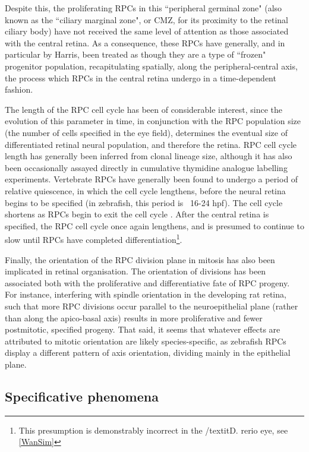Despite this, the proliferating RPCs in this ``peripheral germinal zone" (also known as the ``ciliary marginal zone", or CMZ, for its proximity to the retinal ciliary body) have not received the same level of attention as those associated with the central retina. As a consequence, these RPCs have generally, and in particular by Harris, been treated as though they are a type of ``frozen" progenitor population, recapitulating spatially, along the peripheral-central axis, the process which RPCs in the central retina undergo in a time-dependent fashion\cite{Harris1998}.

The length of the RPC cell cycle has been of considerable interest, since the evolution of this parameter in time, in conjunction with the RPC population size (the number of cells specified in the eye field), determines the eventual size of differentiated retinal neural population, and therefore the retina. RPC cell cycle length has generally been inferred from clonal lineage size, although it has also been occasionally assayed directly in cumulative thymidine analogue labelling experiments. Vertebrate RPCs have generally been found to undergo a period of relative quiescence, in which the cell cycle lengthens, before the neural retina begins to be specified (in zebrafish, this period is ~16-24 hpf). The cell cycle shortens as RPCs begin to exit the cell cycle \cite{Harris1991,Li2000}. After the central retina is specified, the RPC cell cycle once again lengthens, and is presumed to continue to slow until RPCs have completed differentiation\footnote{This presumption is demonstrably incorrect in the /textit{D. rerio} eye, see \autoref{WanSim}}.

Finally, the orientation of the RPC division plane in mitosis has also been implicated in retinal organisation. The orientation of divisions has been associated both with the proliferative and differentiative fate of RPC progeny. For instance, interfering with spindle orientation in the developing rat retina, such that more RPC divisions occur parallel to the neuroepithelial plane (rather than along the apico-basal axis) results in more proliferative and fewer postmitotic, specified progeny\cite{Zigman2005}. That said, it seems that whatever effects are attributed to mitotic orientation are likely species-specific, as zebrafish RPCs display a different pattern of axis orientation, dividing mainly in the epithelial plane\cite{Das2003}.

\subsection{Specificative phenomena}

